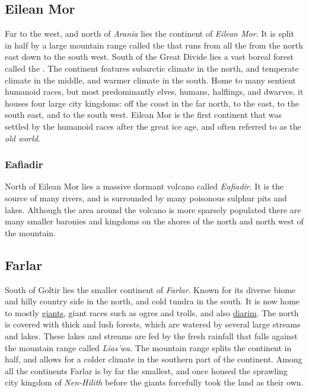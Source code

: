 \subsection{Eilean Mor}
\label{sec:Eilean Mor}

Far to the west, and north of \emph{Arania} lies the continent of \emph{Eilean
  Mor}. It is split in half by a large mountain range called the
 that runs from all the from the north east down to
the south west. South of the Great Divide lies a vast boreal forest called the
. The continent features subarctic climate in the
north, and temperate climate in the middle, and warmer climate in the
south. Home to many sentient humanoid races, but most predominantly elves,
humans, halflings, and dwarves, it houses four large city kingdoms:
 off the coast in the far north, 
to the east,  to the south east, and
 to the south west. Eilean Mor is the first continent
that was settled by the humanoid races after the great ice age, and often
referred to as the \emph{old world}.

\subsubsection{Eafiadir}
\label{sec:Eafiadir}

North of Eilean Mor lies a massive dormant volcano called \emph{Eafiadir}. It
is the source of many rivers, and is surrounded by many poisonous sulphur pits
and lakes. Although the area around the volcano is more sparsely populated
there are many smaller baronies and kingdoms on the shores of the north and
north west of the mountain.

\subsection{Farlar}
\label{sec:Farlar}

South of Goltir lies the smaller continent of \emph{Farlar}. Known for its
diverse biome and hilly country side in the north, and cold tundra in the
south. It is now home to mostly \hyperref[sec:Giants]{giants}, giant races
such as ogres and trolls, and also \hyperref[sec:Diarim]{diarim}. The north is
covered with thick and lush forests, which are watered by several large
streams and lakes. These lakes and streams are fed by the fresh rainfall that
falls against the mountain range called \emph{Lias'wa}. The mountain range
splits the continent in half, and allows for a colder climate in the southern
part of the continent. Among all the continents Farlar is by far the smallest,
and once housed the sprawling city kingdom of \emph{Nen-Hilith} before the
giants forcefully took the land as their own.

